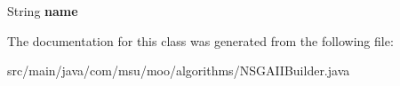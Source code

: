 \begin{DoxyCompactItemize}
\item 
\hypertarget{classcom_1_1msu_1_1moo_1_1algorithms_1_1NSGAIIBuilder_3_01V_01extends_01IVariable_00_01P_01extends_01IProblem_01_4_a208684a0f473c521a41f7349f27fa228}{String {\bfseries name}}\label{classcom_1_1msu_1_1moo_1_1algorithms_1_1NSGAIIBuilder_3_01V_01extends_01IVariable_00_01P_01extends_01IProblem_01_4_a208684a0f473c521a41f7349f27fa228}

\end{DoxyCompactItemize}


The documentation for this class was generated from the following file\-:\begin{DoxyCompactItemize}
\item 
src/main/java/com/msu/moo/algorithms/N\-S\-G\-A\-I\-I\-Builder.\-java\end{DoxyCompactItemize}
